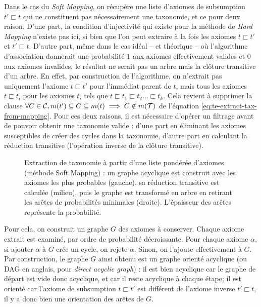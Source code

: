 Dans le cas du \textit{Soft Mapping}, on récupère une liste d'axiomes de subsumption $t' \sqsubset t$ qui ne constituent pas nécessairement une taxonomie, et ce pour deux raison. D'une part, la condition d'injectivité qui existe pour la méthode de \textit{Hard Mapping} n'existe pas ici, si bien que l'on peut extraire à la fois les axiomes $t \sqsubset t'$ et $t' \sqsubset t$. D'autre part, même dans le cas idéal – et théorique – où l'algorithme d'association donnerait une probabilité $1$ aux axiomes effectivement valides et $0$ aux axiomes invalides, le résultat ne serait pas un arbre mais la clôture transitive d'un arbre. En effet, par construction de l'algorithme, on n'extrait pas uniquement l'axiome $t \sqsubset t'$ pour l'immédiat parent de $t$, mais tous les axiomes $t \sqsubset t_i$ pour les axiomes $t_i$ tels que $t \sqsubset t_1 \sqsubset t_2 \ldots \sqsubset t_k$. Cela revient à supprimer la clause $\forall C \in \cal{C},  m(t') \subseteq C \subseteq m(t) \implies C \notin m(\cal{T})$ de l'équation \ref{eq:te-extract-tax-from-mapping}. Pour ces deux raisons, il est nécessaire d'opérer un filtrage avant de pouvoir obtenir une taxonomie valide : d'une part en éliminant les axiomes susceptibles de créer des cycles dans la taxonomie, d'autre part en calculant la réduction transitive (l'opération inverse de la clôture transitive).

\begin{figure}
    \centering
    
    \caption[Extraction de taxonomie à partir d'un graphe acyclique]{Extraction de taxonomie à partir d'une liste pondérée d'axiomes (méthode Soft Mapping) : un graphe acyclique est construit avec les axiomes les plus probables (gauche), sa réduction transitive est calculée (milieu), puis le graphe est transformé en arbre en retirant les arêtes de probabilités minimales (droite). L'épaisseur des arêtes représente la probabilité.}
    \label{fig:softmapping-extraction}
\end{figure}

Pour cela, on construit un graphe $G$ des axiomes à conserver. Chaque axiome extrait est examiné, par ordre de probabilité décroissante. Pour chaque axiome $\alpha$, si ajouter $\alpha$ à $G$ crée un cycle, on rejete $\alpha$. Sinon, on l'ajoute effectivement à $G$. Par construction, le graphe $G$ ainsi obtenu est un graphe orienté acyclique (ou DAG en anglais, pour \textit{direct acyclic graph}) : il est bien acyclique car le graphe de départ est vide donc acyclique, et car il reste acyclique à chaque étape; il est orienté car l'axiome de subsumption $t \sqsubset t'$ est différent de l'axiome inverse $t' \sqsubset t$, il y a donc bien une orientation des arêtes de $G$. 


